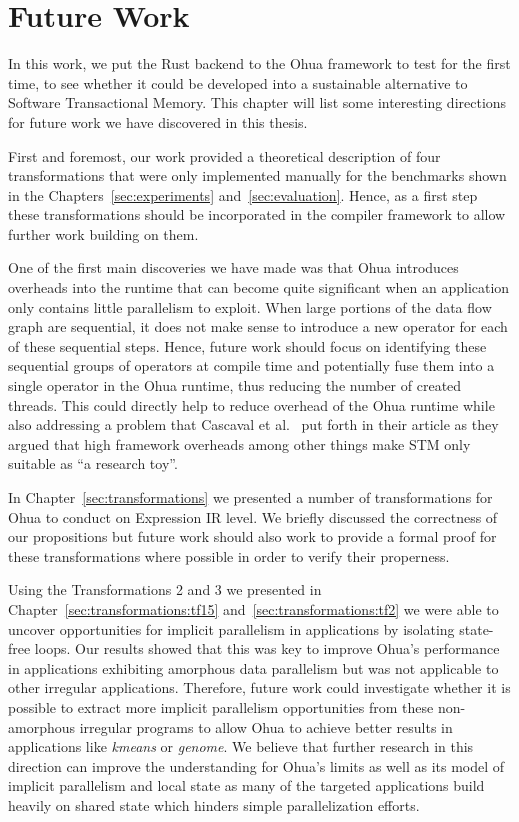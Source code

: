 %
\chapter{Future Work}
\label{sec:future}

In this work, we put the Rust backend to the Ohua framework to test for the first time, to see whether it could be developed into a sustainable alternative to Software Transactional Memory.
This chapter will list some interesting directions for future work we have discovered in this thesis.

First and foremost, our work provided a theoretical description of four transformations that were only implemented manually for the benchmarks shown in the Chapters~\ref{sec:experiments} and~\ref{sec:evaluation}.
Hence, as a first step these transformations should be incorporated in the compiler framework to allow further work building on them.

One of the first main discoveries we have made was that Ohua introduces overheads into the runtime that can become quite significant when an application only contains little parallelism to exploit.
When large portions of the data flow graph are sequential, it does not make sense to introduce a new operator for each of these sequential steps.
Hence, future work should focus on identifying these sequential groups of operators at compile time and potentially fuse them into a single operator in the Ohua runtime, thus reducing the number of created threads.
This could directly help to reduce overhead of the Ohua runtime while also addressing a problem that Cascaval et al.~\cite{cascaval2008software} put forth in their article as they argued that high framework overheads among other things make STM only suitable as \enquote{a research toy}.

In Chapter~\ref{sec:transformations} we presented a number of transformations for Ohua to conduct on Expression IR level.
We briefly discussed the correctness of our propositions but future work should also work to provide a formal proof for these transformations where possible in order to verify their properness.

Using the Transformations 2 and 3 we presented in Chapter~\ref{sec:transformations:tf15} and~\ref{sec:transformations:tf2} we were able to uncover opportunities for implicit parallelism in applications by isolating state-free loops.
Our results showed that this was key to improve Ohua's performance in applications exhibiting amorphous data parallelism but was not applicable to other irregular applications.
Therefore, future work could investigate whether it is possible to extract more implicit parallelism opportunities from these non-amorphous irregular programs to allow Ohua to achieve better results in applications like \emph{kmeans} or \emph{genome}.
We believe that further research in this direction can improve the understanding for Ohua's limits as well as its model of implicit parallelism and local state as many of the targeted applications build heavily on shared state which hinders simple parallelization efforts.

